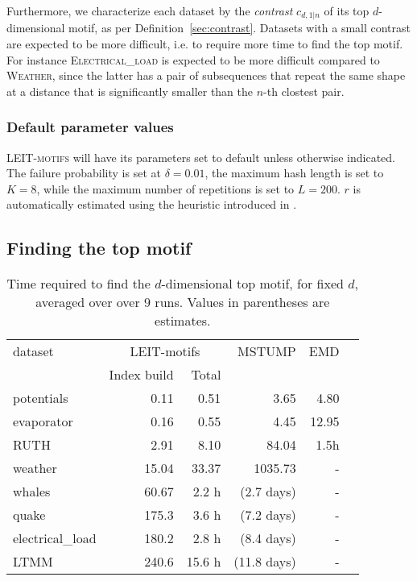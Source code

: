 Furthermore, we characterize each dataset by the \emph{contrast} $c_{d,1|n}$ of its top $d$-dimensional motif, as per Definition~\ref{sec:contrast}.
Datasets with a small contrast are expected to be more difficult, i.e. to require more time to find the top motif.
For instance \textsc{Electrical\_load} is expected to be more difficult compared to \textsc{Weather}, since the latter has a pair of subsequences that repeat the same shape at a distance that is significantly smaller than the $n$-th clostest pair.

\subsubsection*{Default parameter values}
\textsc{LEIT-motifs} will have its parameters set to default unless otherwise indicated.
The failure probability is set at $\delta=0.01$, the maximum hash length is set to $K = 8$, while the maximum number of repetitions is set to $L = 200$. $r$ is automatically estimated using the heuristic introduced in .


\subsection{Finding the top motif}
\begin{table}[t]
\caption{Time required to find the $d$-dimensional top motif, for fixed $d$, averaged over over 9 runs. Values in parentheses are estimates.
}
\centering
\begin{tabular}{lrrrrr}
\toprule
dataset    &\multicolumn{2}{c}{LEIT-motifs} & MSTUMP    & EMD     \\ 
\cmidrule{2-3}
 & Index build & Total  &&\\
\midrule
potentials & 0.11 & \cellcolor[HTML]{CDF2D9} 0.51 &   3.65     &   4.80 \\
evaporator & 0.16 & \cellcolor[HTML]{CDF2D9} 0.55 &  4.45 &    12.95\\
RUTH &  2.91 & \cellcolor[HTML]{CDF2D9} 8.10 &   84.04 & 1.5h\\
weather   & 15.04 & \cellcolor[HTML]{CDF2D9} 33.37 &   1035.73    &          -\\ 
whales   & 60.67 & \cellcolor[HTML]{CDF2D9} 2.2 h   &    (2.7 days) & -\\ 
quake    & 175.3 & \cellcolor[HTML]{CDF2D9} 3.6 h &  (7.2 days) & -\\ 
electrical\_load    & 180.2 & \cellcolor[HTML]{CDF2D9} 2.8 h &   (8.4 days) & -\\ 
LTMM    & 240.6 & \cellcolor[HTML]{CDF2D9} 15.6 h &   (11.8 days)    &  -\\
\bottomrule
\end{tabular}
\label{tab:time-fixed-d}
\end{table}


